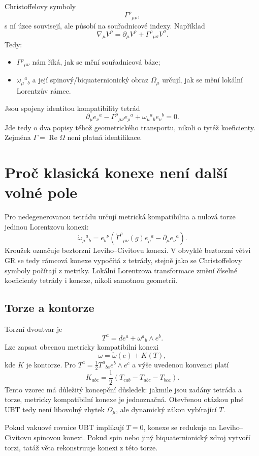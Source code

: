Christoffelovy symboly
\[
 \Gamma^\rho{}_{\mu\nu},
\]
s ní úzce souvisejí, ale působí na souřadnicové indexy. Například
\[
 \nabla_\mu V^\rho=\partial_\mu V^\rho
 +\Gamma^\rho{}_{\mu\sigma}V^\sigma.
\]
Tedy:
\begin{itemize}
 \item $\Gamma^\rho{}_{\mu\nu}$ nám říká, jak se mění souřadnicová báze;
 \item $\omega_\mu{}^a{}_b$ a její spinový/biquaternionický obraz $\Omega_\mu$
       určují, jak se mění lokální Lorentzův rámec.
\end{itemize}
Jsou spojeny identitou kompatibility tetrád
\[
 \partial_\mu e_\nu{}^a-\Gamma^\rho{}_{\mu\nu}e_\rho{}^a
 +\omega_\mu{}^a{}_b e_\nu{}^b=0.
\]
Jde tedy o dva popisy téhož geometrického transportu, nikoli o tytéž
koeficienty. Zejména $\Gamma=\operatorname{Re}\Omega$ není platná
identifikace.

\section{Proč klasická konexe není další volné pole}
Pro nedegenerovanou tetrádu určují metrická kompatibilita a nulová torze
jedinou Lorentzovu konexi:
\[
 \boxed{
 \mathring\omega_\mu{}^a{}_b
 =e_b{}^\nu\left(\mathring\Gamma^\rho{}_{\mu\nu}(g)e_\rho{}^a
 -\partial_\mu e_\nu{}^a\right).}
\]
Kroužek označuje beztorzní Leviho--Civitovu konexi. V obvyklé beztorzní
větvi GR se tedy rámcová konexe vypočítá z tetrády, stejně jako se
Christoffelovy symboly počítají z metriky. Lokální Lorentzova transformace
změní číselné koeficienty tetrády i konexe, nikoli samotnou geometrii.

\subsection{Torze a kontorze}
Torzní dvoutvar je
\[
 T^a=de^a+\omega^a{}_b\wedge e^b.
\]
Lze zapsat obecnou metricky kompatibilní konexi
\[
 \boxed{\omega=\mathring\omega(e)+K(T),}
\]
kde $K$ je kontorze. Pro
$T^a=\tfrac12T^a{}_{bc}e^b\wedge e^c$ a výše uvedenou konvenci platí
\[
 \boxed{
 K_{abc}=\frac12\left(T_{cab}-T_{abc}-T_{bca}\right).}
\]
Tento vzorec má důležitý koncepční důsledek: jakmile jsou zadány tetráda
a torze, metricky kompatibilní konexe je jednoznačná. Otevřenou otázkou plné
UBT tedy není libovolný zbytek $\Omega_\mu$, ale dynamický zákon vybírající
$T$.

Pokud vakuové rovnice UBT implikují $T=0$, konexe se redukuje na
Leviho--Civitovu spinovou konexi. Pokud spin nebo jiný biquaternionický zdroj
vytvoří torzi, tatáž věta rekonstruuje konexi z této torze.

